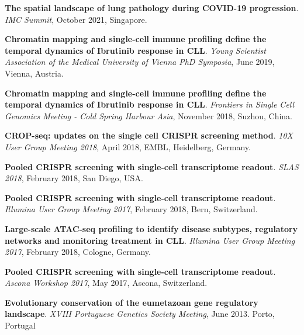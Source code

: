 \documentclass[11pt,a4paper,roman]{moderncv} %
\begin{document}
\begin{etaremune}[leftmargin=1.0cm,itemindent=0pt,topsep=10pt,itemsep=2pt,partopsep=0pt,parsep=0pt]
        \textbf{The spatial landscape of lung pathology during COVID-19 progression}. \textit{IMC Summit}, October 2021, Singapore.
        \item
        \textbf{Chromatin mapping and single-cell immune profiling define the temporal dynamics of Ibrutinib response in CLL}. \textit{Young Scientist Association of the Medical University of Vienna PhD Symposia}, June 2019, Vienna, Austria.
        \item
        \textbf{Chromatin mapping and single-cell immune profiling define the temporal dynamics of Ibrutinib response in CLL}. \textit{Frontiers in Single Cell Genomics Meeting - Cold Spring Harbour Asia}, November 2018, Suzhou, China.
        \item
        \textbf{CROP-seq: updates on the single cell CRISPR screening method}. \textit{10X User Group Meeting 2018}, April 2018, EMBL, Heidelberg, Germany.
        \item
        \textbf{Pooled CRISPR screening with single-cell transcriptome readout}. \textit{SLAS 2018}, February 2018, San Diego, USA.
        \item
        \textbf{Pooled CRISPR screening with single-cell transcriptome readout}. \textit{Illumina User Group Meeting 2017}, February 2018, Bern, Switzerland.
        \item
        \textbf{Large-scale ATAC-seq profiling to identify disease subtypes, regulatory networks and monitoring treatment in CLL}. \textit{Illumina User Group Meeting 2017}, February 2018, Cologne, Germany.
        \item
        \textbf{Pooled CRISPR screening with single-cell transcriptome readout}. \textit{Ascona Workshop 2017}, May 2017, Ascona, Switzerland.
        \item
        \textbf{Evolutionary conservation of the eumetazoan gene regulatory landscape}. \textit{XVIII Portuguese Genetics Society Meeting}, June 2013. Porto, Portugal
        \end{etaremune}
\end{document}
